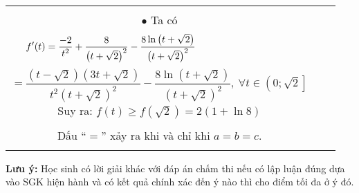 \documentclass[11pt,a4paper]{book}
\begin{document}
\begin{center}
\begin{longtable}{||c|c|c||}
{			$\bullet$ Xét hàm $f(t)=\dfrac{2}{t}+\dfrac{8\ln\left(t+\sqrt{2}\right)}{t+\sqrt{2}}$, trên $t\in\left(0;\sqrt{2}\right]$\\[10pt]
			$\bullet$ Ta có
			$$f'(t)=\frac{-2}{t^2}+\frac{8}{\left(t+\sqrt{2}\right)^2}-\frac{8\ln\left(t+ \sqrt{2}\right)}{\left(t+\sqrt{2}\right)^2}\mbox{\qquad\qquad\qquad\qquad\qquad}$$
			$$=
			\frac{\left(t-\sqrt{2}\right)\left(3t+\sqrt{2}\right)}{t^2\left(t+\sqrt{2}\right)^2}-\frac{8\ln\left(t+ \sqrt{2}\right)}{\left(t+\sqrt{2}\right)^2},~\forall t\in\left(0;\sqrt{2}\right] 
			$$
			Suy ra: $f(t)\geq f(\sqrt{2})=2\left(1+\ln 8\right)$\\[-5pt]
		}
		\rowEnd{
			Vậy $P_{\min} =2\left(1+\ln 8\right)$.\\[8pt]
			Dấu ``$=$'' xảy ra khi và chỉ khi $a=b=c$.\\[-8pt]
		}
	\end{longtable}
\end{center}
\textbf{Lưu ý:} Học sinh có lời giải khác với đáp án chấm thi nếu có lập luận đúng dựa vào SGK hiện hành và có kết quả chính xác đến ý nào thì cho điểm tối đa ở ý đó.
\end{document}
